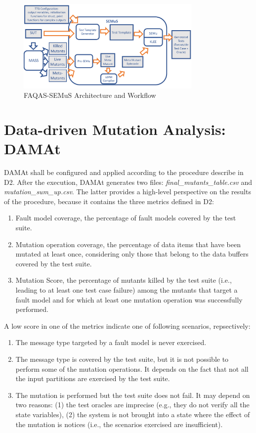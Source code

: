 \begin{figure}[h]
\begin{center}
\includegraphics[width=0.8\textwidth]{images/semus-architecture2}
\caption{FAQAS-SEMuS Architecture and Workflow}
\label{fig:semus_architecture}
\end{center}
\end{figure}

\clearpage
\section{Data-driven Mutation Analysis: DAMAt}
\label{sec:meth:damat}

DAMAt shall be configured and applied according to the procedure describe in D2.
After the execution, DAMAt generates two files: \emph{final\_mutants\_table.csv} and \emph{mutation\_sum\_up.csv}.
The latter provides a high-level perspective on the results of the procedure, because it contains the three metrics defined in D2:
\begin{enumerate}
\item Fault model coverage, the percentage of fault models covered by the test suite.
\item Mutation operation coverage, the percentage of data items that have been mutated at least once, considering only those that belong to the data buffers covered by the test suite.
\item Mutation Score, the percentage of mutants killed by the test suite (i.e., leading to at least one test case failure) among the mutants that target a fault model and for which at least one mutation operation was successfully performed.
\end{enumerate}
 

A low score in one of the metrics indicate one of following scenarios, repsectively:
\begin{enumerate}
\item The message type targeted by a fault model is never exercised.
\item The message type is covered by the test suite, but it is not possible to perform some of the mutation operations. It depends on the fact that not all the input partitions are exercised by the test suite.
\item The mutation is performed but the test suite does not fail. It may depend on two reasons: (1) the test oracles are imprecise (e.g., they do not verify all the state variables), (2) the system is not brought into a state where the effect of the mutation is notices (i.e., the scenarios exercised are insufficient).
\end{enumerate}
 
